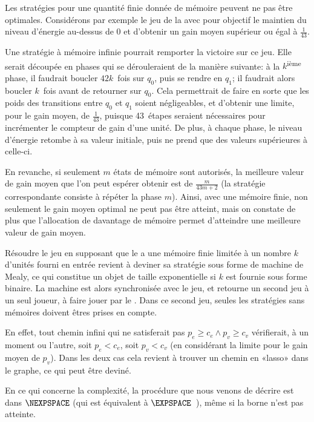 \begin{remark}
Les stratégies pour une quantité finie donnée de mémoire peuvent ne pas être optimales.
Considérons par exemple le jeu de la  avec pour objectif le maintien du niveau d'énergie au-dessus de $0$ et d'obtenir un gain moyen supérieur ou égal à $\frac1{43}$.

Une stratégie à mémoire infinie pourrait remporter la victoire sur ce jeu.
Elle serait découpée en phases qui se dérouleraient de la manière suivante: à la $k$\textsuperscript{ième} phase, il faudrait boucler $42k$~fois sur $q_0$, puis se rendre en $q_1$; il faudrait alors boucler $k$~fois avant de retourner sur $q_0$.
Cela permettrait de faire en sorte que les poids des transitions entre $q_0$ et $q_1$ soient négligeables, et d'obtenir une limite, pour le gain moyen, de $\frac1{43}$, puisque 43~étapes seraient nécessaires pour incrémenter le compteur de gain d'une unité.
De plus, à chaque phase, le niveau d'énergie retombe à sa valeur initiale, puis ne prend que des valeurs supérieures à celle-ci.

En revanche, si seulement $m$ états de mémoire sont autorisés, la meilleure valeur de gain moyen que l'on peut espérer obtenir est de $\frac{m}{43m+2}$ (la stratégie correspondante consiste à répéter la phase $m$).
Ainsi, avec une mémoire finie, non seulement le gain moyen optimal ne peut pas être atteint, mais on constate de plus que l'allocation de davantage de mémoire permet d'atteindre une meilleure valeur de gain moyen.
\end{remark}

Résoudre le jeu en supposant que le \jo a une mémoire finie limitée à un nombre $k$ d'unités fourni en entrée revient à deviner sa stratégie sous forme de machine de Mealy, ce qui constitue un objet de taille exponentielle si $k$ est fournie sous forme binaire.
La machine est alors synchronisée avec le jeu, et retourne un second jeu à un seul joueur, à faire jouer par le \ji.
Dans ce second jeu, seules les stratégies sans mémoires doivent êtres prises en compte.

En effet, tout chemin infini qui ne satisferait pas $p_e \geq c_e \wedge p_v \geq c_v$ vérifierait, à un moment ou l'autre, soit $p_e < c_e$, soit $p_v < c_v$ (en considérant la limite pour le gain moyen de $p_v$).
Dans les deux cas cela revient à trouver un chemin en «lasso» dans le graphe, ce qui peut être deviné.

En ce qui concerne la complexité, la procédure que nous venons de décrire est dans $\NEXPSPACE$ (qui est équivalent à $\EXPSPACE$~\cite[Chap.~20]{papadimitriou94}), même si la borne n'est pas atteinte.
